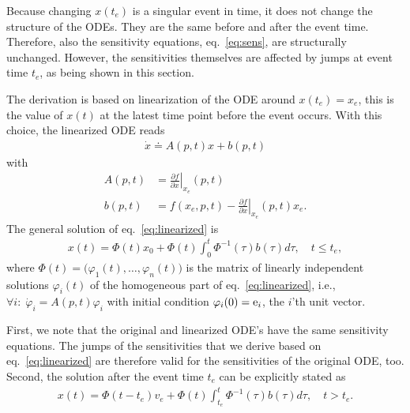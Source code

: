 \documentclass[journal, a4paper]{IEEEtran}
\begin{document}
Because changing $x(t_e)$ is a singular event in time, it does not change the structure of the ODEs. They are the same before and after the event time. Therefore, also the sensitivity equations, eq.~\eqref{eq:sens}, are structurally unchanged. However, the sensitivities themselves are affected by jumps at event time $t_e$, as being shown in this section.

The derivation is based on linearization of the ODE around $x(t_e) = x_e$, this is the value of $x(t)$ at the latest time point before the event occurs. With this choice, the linearized ODE reads
\begin{align}
    \dot x \doteq A(p, t) x + b(p, t)
    \label{eq:linearized}
\end{align}
with 
\begin{align*}
A(p, t) &= \left.\frac{\partial f}{\partial x}\right|_{x_e}(p, t)\\
b(p, t) &= f(x_e, p, t)- \left.\frac{\partial f}{\partial x}\right|_{x_e}(p, t)x_e.
\end{align*}
The general solution of eq.~\eqref{eq:linearized} is
\begin{align}
    x(t) = \Phi(t)x_0 + \Phi(t)\int_0^t \Phi^{-1}(\tau)b(\tau)d\tau,\quad t\leq t_e,
    \label{eq:leqte}
\end{align}
where $\Phi(t) = \big(\varphi_1(t), \dots, \varphi_n(t)\big)$ is the matrix of linearly independent solutions $\varphi_i(t)$ of the homogeneous part of eq.~\eqref{eq:linearized}, i.e., $\forall i:\;\dot\varphi_i = A(p, t)\varphi_i$ with initial condition $\varphi_i(0) = {\rm e}_i$, the $i$'th unit vector. 

First, we note that the original and linearized ODE's have the same sensitivity equations. The jumps of the sensitivities that we derive based on eq.~\eqref{eq:linearized} are therefore valid for the sensitivities of the original ODE, too. Second, the solution after the event time $t_e$ can be explicitly stated as
\begin{align}
    x(t) = \Phi(t-t_e)v_e + \Phi(t)\int_{t_e}^{t}\Phi^{-1}(\tau)b(\tau)d\tau,\quad t > t_e.
    \label{eq:gte}
\end{align}
\end{document}
